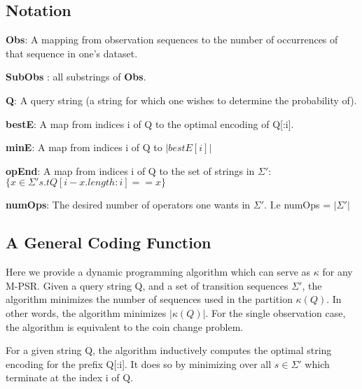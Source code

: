 
\subsection{Notation}


\textbf{Obs}: A mapping from observation sequences to the number of occurrences of that sequence in one's dataset. 

\textbf{SubObs} : all substrings of \textbf{Obs}.

\textbf{Q}: A query string (a string for which one wishes to determine the probability of).

\textbf{bestE}: A map from indices i of Q to the optimal encoding of Q[:i].

\textbf{minE}: A map from indices i of Q to $|bestE[i]|$

\textbf{opEnd}: A map from indices i of Q to the set of strings in $\Sigma'$: $\{x \in \Sigma' s.t Q[i-x.length:i] == x\}$

\textbf{numOps}: The desired number of operators one wants in $\Sigma'$. I.e numOps =  $|\Sigma'|$

\subsection{A General Coding Function}

Here we provide a dynamic programming algorithm which can serve as $\kappa$ for any M-PSR. Given a query string Q, and a set of transition sequences $\Sigma'$, the algorithm minimizes the number of sequences used in the partition $\kappa(Q)$. In other words, the algorithm minimizes $|\kappa(Q)|$. For the single observation case, the algorithm is equivalent to the coin change problem.

For a given string Q, the algorithm inductively computes the optimal string encoding for the prefix Q[:i]. It does so by minimizing over all $s \in \Sigma'$ which terminate at the index i of Q.


